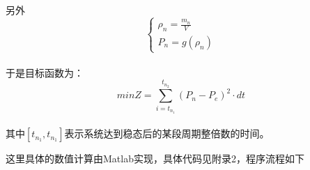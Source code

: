 \documentclass[a4paper]{article}
\begin{document}
\\另外
\begin{equation} \begin{cases} \rho_n = \frac{m_n}{V}\\
	P_n=g(\rho_n) \end{cases} \end{equation}
\\于是目标函数为：
\begin{equation} minZ=\sum_{i=t_{n_1}}^{t_{n_2}}  (P_n-P_e)^2\cdot dt
\end{equation}
\\其中$[t_{n_1},t_{n_1}]$表示系统达到稳态后的某段周期整倍数的时间。
\par
这里具体的数值计算由Matlab实现，具体代码见附录2，程序流程如下




\begin{algorithm}[H]
 
	\SetAlFnt{\small}
	\SetAlCapFnt{\large}
	\SetAlCapNameFnt{\large}
	
	\BlankLine


	\caption{问题1的程序流程}
	\label{alg:算法1}
	\end{algorithm}
\end{document}
